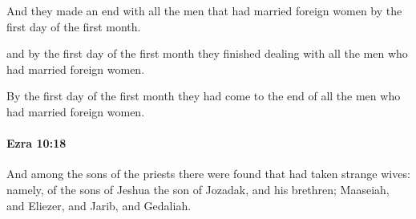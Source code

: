 			\begin{versebox}
					\item[BHS] 
					\item[LXX] 
					\item[ASV] And they made an end with all the men that had married foreign women by the first day of the first month.
					\item[NIV] and by the first day of the first month they finished dealing with all the men who had married foreign women.
					\item[NRSV] By the first day of the first month they had come to the end of all the men who had married foreign women.
			\end{versebox}

		\paragraph{Ezra 10:18} %
			\label{EZRA-10-18}

			And among the sons of the priests there were found that had taken strange wives: namely, of the sons of Jeshua the son of Jozadak, and his brethren; Maaseiah, and Eliezer, and Jarib, and Gedaliah.

